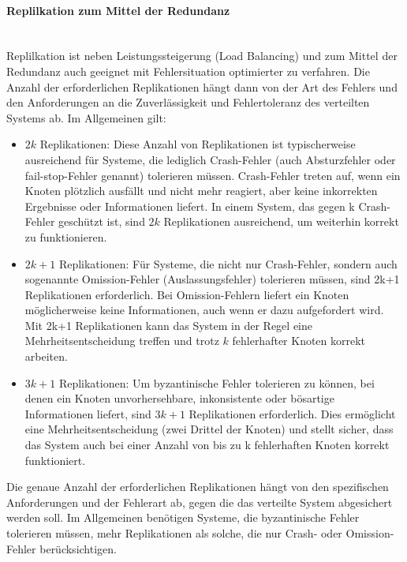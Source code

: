 \paragraph{Replilkation zum Mittel der Redundanz\\\\}
Replilkation ist neben Leistungssteigerung (Load Balancing) und zum Mittel der Redundanz auch geeignet mit Fehlersituation optimierter zu verfahren.
Die Anzahl der erforderlichen Replikationen hängt dann von der Art des Fehlers und den Anforderungen an die Zuverlässigkeit und Fehlertoleranz des verteilten Systems ab. Im Allgemeinen gilt: 
\begin{itemize}
\item \textbf{$2k$} Replikationen: Diese Anzahl von Replikationen ist typischerweise ausreichend für Systeme, die lediglich Crash-Fehler (auch Absturzfehler oder fail-stop-Fehler genannt) tolerieren müssen. Crash-Fehler treten auf, wenn ein Knoten plötzlich ausfällt und nicht mehr reagiert, aber keine inkorrekten Ergebnisse oder Informationen liefert. In einem System, das gegen k Crash-Fehler geschützt ist, sind $2k$ Replikationen ausreichend, um weiterhin korrekt zu funktionieren.
\item \textbf{$2k+1$} Replikationen: Für Systeme, die nicht nur Crash-Fehler, sondern auch sogenannte Omission-Fehler (Auslassungsfehler) tolerieren müssen, sind 2k+1 Replikationen erforderlich. Bei Omission-Fehlern liefert ein Knoten möglicherweise keine Informationen, auch wenn er dazu aufgefordert wird. Mit 2k+1 Replikationen kann das System in der Regel eine Mehrheitsentscheidung treffen und trotz $k$ fehlerhafter Knoten korrekt arbeiten.
\item \textbf{$3k+1$} Replikationen: Um byzantinische Fehler tolerieren zu können, bei denen ein Knoten unvorhersehbare, inkonsistente oder bösartige Informationen liefert, sind $3k+1$ Replikationen erforderlich. Dies ermöglicht eine Mehrheitsentscheidung (zwei Drittel der Knoten) und stellt sicher, dass das System auch bei einer Anzahl von bis zu k fehlerhaften Knoten korrekt funktioniert.
\end{itemize}
Die genaue Anzahl der erforderlichen Replikationen hängt von den spezifischen Anforderungen und der Fehlerart ab, gegen die das verteilte System abgesichert werden soll. Im Allgemeinen benötigen Systeme, die byzantinische Fehler tolerieren müssen, mehr Replikationen als solche, die nur Crash- oder Omission-Fehler berücksichtigen.

